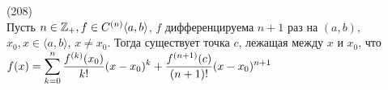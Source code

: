 (208)\\
Пусть $n \in \mathbb{Z}_+, f \in C^{(n)}\langle a, b\rangle$, $f$ дифференцируема $n + 1$ раз на $(a, b)$, $x_0, x\in \langle a, b\rangle$, $x \neq x_0$. Тогда существует точка $c$, лежащая между $x$ и $x_0$, что\\
$f(x) = \displaystyle\sum\limits^{n}_{k = 0} \frac{f^{(k)}(x_0)}{k!}(x - x_0)^k + \frac{f^{(n + 1)}(c)}{(n + 1)!}(x - x_0)^{n + 1}$